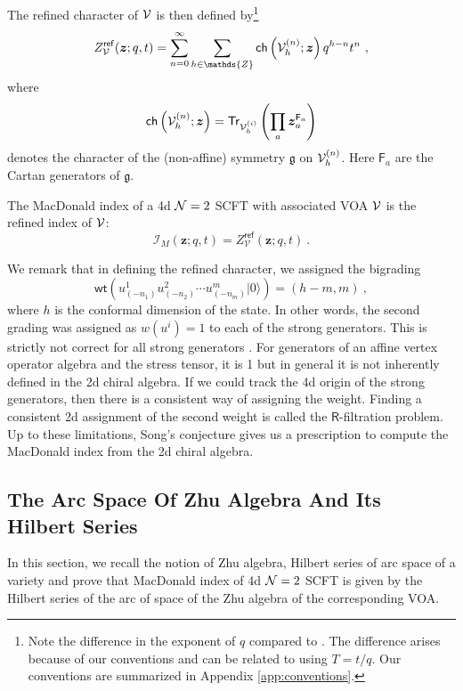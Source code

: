 \documentclass[a4paper,10pt]{article}
\newcommand{\Z}{\mathds{Z}}
\newcommand{\mr}[1]{\mathsf{#1}}
\newcommand{\tsf}[1]{\textsf{#1}}
\def\CN {{\cal N}}
\def\CV {{\cal V}}
\begin{document}
The refined character of $\CV$ is then defined by\footnote{Note the difference in the exponent of $q$ compared to \cite[Eq. (1.8)]{Song:2016yfd}. The difference arises because of our conventions and can be related to \cite{Song:2016yfd} using $T=t/q$. Our conventions are summarized in Appendix \ref{app:conventions}.}
\begin{equation}\label{eq:ref_char_song}
Z_{\mathcal{V}}^{\mathsf{ref}}(\boldsymbol{z} ; q, t)=\sum_{n=0}^{\infty} \sum_{h\in\Z} \mr{ch}\left(\CV_h^{(n)} ; \boldsymbol{z}\right) q^{h-n} t^n~,
\end{equation}
where  
\begin{equation}
\mr{ch}\left(\CV_h^{(n)} ; \boldsymbol{z}\right)=\mr{Tr}_{\CV_h^{(i)}}\left(\prod_a \boldsymbol{z}_a^{\mr{F}_a}\right)    
\end{equation}
denotes the character of the (non-affine) symmetry $\mathfrak{g}$ on $\CV_h^{(n)}$. Here $\mr{F}_a$ are the Cartan generators of $\mathfrak{g}$. 
\begin{conj}\cite[Song]{Song:2016yfd}
The MacDonald index of a 4d $\CN=2$ \tsf{SCFT} with associated \tsf{VOA} $\CV$ is the refined index of $\CV$:
\begin{equation}\label{eq:song_conj}
    \mathcal{I}_M(\boldsymbol{z};q,t)=Z_{\mathcal{V}}^{\mathsf{ref}}(\boldsymbol{z} ; q, t)~.
\end{equation}
\end{conj}
We remark that in defining the refined character, we assigned the bigrading 
\begin{equation}
    \mr{wt}\left(u_{(-n_1)}^{1} u_{(-n_2)}^{2} \cdots u_{(-n_m)}^{m}|0\rangle\right)=(h-m,m)~,
\end{equation}
where $h$ is the conformal dimension of the state. In other words, the second grading was assigned as $w(u^i)=1$ to each of the strong generators. This is strictly not correct for all strong generators \cite{Song:2016yfd}. For generators of an affine vertex operator algebra and the stress tensor, it is 1 but in general it is not inherently defined in the 2d chiral algebra. If we could track the 4d origin of the strong generators, then there is a consistent way of assigning the weight. Finding a consistent 2d assignment of the second weight is called the $\mr{R}$-filtration problem. Up to these limitations, Song's conjecture gives us a prescription to compute the MacDonald index from the 2d chiral algebra.  
\subsection{The Arc Space Of Zhu Algebra And Its Hilbert Series}
In this section, we recall the notion of Zhu algebra, Hilbert series of arc space of a variety and prove that MacDonald index of 4d $\CN=2$ \tsf{SCFT} is given by the Hilbert series of the arc of space of the Zhu algebra of the corresponding \tsf{VOA}.
\end{document}
